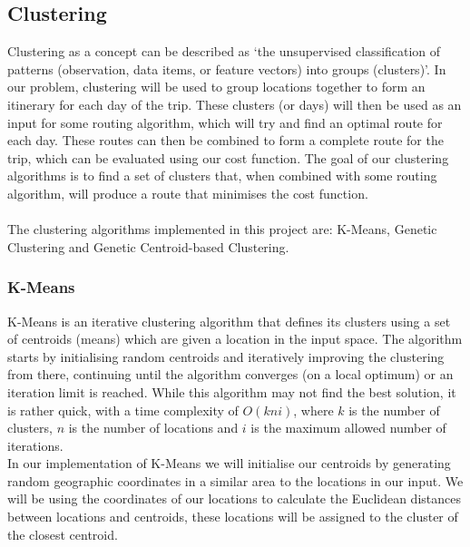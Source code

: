 

\subsection{Clustering}\label{subsec:clustering}
Clustering as a concept can be described as `the unsupervised classification of patterns (observation, data items, or
feature vectors) into groups (clusters)'.
In our problem, clustering will be used to group locations together to form an itinerary for each day of the trip.
These clusters (or days) will then be used as an input for some routing algorithm, which will try and find an
optimal route for each day.
These routes can then be combined to form a complete route for the trip, which can be evaluated using our cost
function.
The goal of our clustering algorithms is to find a set of clusters that, when combined with some routing algorithm,
will produce a route that minimises the cost function.\\
\\
The clustering algorithms implemented in this project are: K-Means, Genetic Clustering and Genetic Centroid-based
Clustering.
\subsubsection{K-Means}\label{subsubsec:k-means}
K-Means is an iterative clustering algorithm that defines its clusters using a set of centroids (means) which are
given a location in the input space.
The algorithm starts by initialising random centroids and iteratively improving the clustering from there, continuing
until the algorithm converges (on a local optimum) or an iteration limit is reached.
While this algorithm may not find the best solution, it is rather quick, with a time complexity of $O(kni)$, where $k$
is the number of clusters, $n$ is the number of locations and $i$ is the maximum allowed number of iterations.\\

\noindent
In our implementation of K-Means we will initialise our centroids by generating random geographic coordinates in
a similar area to the locations in our input.
We will be using the coordinates of our locations to calculate the Euclidean distances between locations and centroids,
these locations will be assigned to the cluster of the closest centroid.

